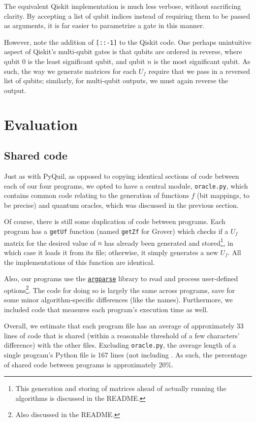 \documentclass[12pt]{article}
\begin{document}
The equivalent Qiskit implementation is much less verbose, without sacrificing clarity.
By accepting a list of qubit indices instead of requiring them to be passed as arguments, it is far easier to parametrize a gate in this manner.

However, note the addition of \texttt{[::-1]} to the Qiskit code.
One perhaps unintuitive aspect of Qiskit's multi-qubit gates is that qubits are ordered in reverse, where qubit 0 is the least significant qubit, and qubit $n$ is the most significant qubit.
As such, the way we generate matrices for each $U_f$ require that we pass in a reversed list of qubits; similarly, for multi-qubit outputs, we must again reverse the output.

\section{Evaluation}

\subsection{Shared code}
Just as with PyQuil, as opposed to copying identical sections of code between each of our four programs, we opted to have a central module, \texttt{oracle.py}, which contains common code relating to the generation of functions $f$ (bit mappings, to be precise) and quantum oracles, which was discussed in the previous section.

Of course, there is still some duplication of code between programs.
Each program has a \texttt{getUf} function (named \texttt{getZf} for Grover) which checks if a $U_f$ matrix for the desired value of $n$ has already been generated and stored\footnote{This generation and storing of matrices ahead of actually running the algorithms is discussed in the README.},
in which case it loads it from its file; otherwise, it simply generates a new $U_f$.
All the implementations of this function are identical.

Also, our programs use the \href{https://docs.python.org/3/library/argparse.html}{\texttt{argparse}} library \cite{python3} to read and process user-defined options\footnote{Also discussed in the README.}.
The code for doing so is largely the same across programs, save for some minor algorithm-specific differences (like the names).
Furthermore, we included code that measures each program's execution time as well.

Overall, we estimate that each program file has an average of approximately 33 lines of code that is shared (within a reasonable threshold of a few characters' difference) with the other files.
Excluding \texttt{oracle.py}, the average length of a single program's Python file is 167 lines (not including .
As such, the percentage of shared code between programs is approximately 20\%.
\end{document}
